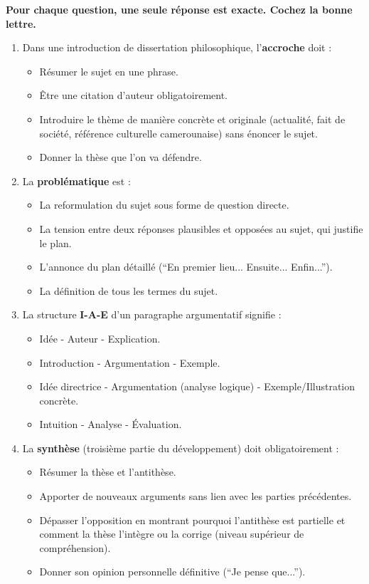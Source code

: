 \documentclass[11pt]{article}
\begin{document}
\begin{exercice}
\textbf{Pour chaque question, une seule réponse est exacte. Cochez la bonne lettre.}
\begin{enumerate}
    \item Dans une introduction de dissertation philosophique, l'\textbf{accroche} doit :
    \begin{itemize}
        \item[A.] Résumer le sujet en une phrase.
        \item[B.] Être une citation d'auteur obligatoirement.
        \item[C.] Introduire le thème de manière concrète et originale (actualité, fait de société, référence culturelle camerounaise) sans énoncer le sujet.
        \item[D.] Donner la thèse que l'on va défendre.
    \end{itemize}
    \item La \textbf{problématique} est :
    \begin{itemize}
        \item[A.] La reformulation du sujet sous forme de question directe.
        \item[B.] La tension entre deux réponses plausibles et opposées au sujet, qui justifie le plan.
        \item[C.] L'annonce du plan détaillé (``En premier lieu... Ensuite... Enfin...'').
        \item[D.] La définition de tous les termes du sujet.
    \end{itemize}
    \item La structure \textbf{I-A-E} d'un paragraphe argumentatif signifie :
    \begin{itemize}
        \item[A.] Idée - Auteur - Explication.
        \item[B.] Introduction - Argumentation - Exemple.
        \item[C.] Idée directrice - Argumentation (analyse logique) - Exemple/Illustration concrète.
        \item[D.] Intuition - Analyse - Évaluation.
    \end{itemize}
    \item La \textbf{synthèse} (troisième partie du développement) doit obligatoirement :
    \begin{itemize}
        \item[A.] Résumer la thèse et l'antithèse.
        \item[B.] Apporter de nouveaux arguments sans lien avec les parties précédentes.
        \item[C.] Dépasser l'opposition en montrant pourquoi l'antithèse est partielle et comment la thèse l'intègre ou la corrige (niveau supérieur de compréhension).
        \item[D.] Donner son opinion personnelle définitive (``Je pense que...'').
    \end{itemize}
\end{enumerate}
\end{exercice}
\end{document}
